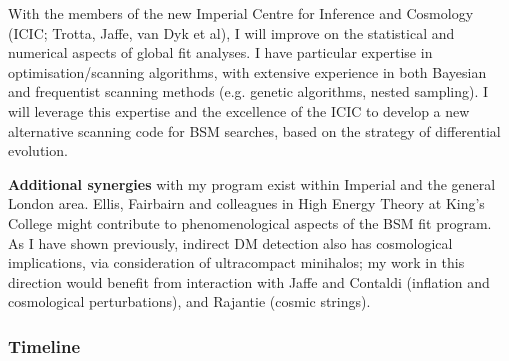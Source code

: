 \documentclass[11pt,oneside,twocolumn,a4paper]{article}
\begin{document}
With the members of the new Imperial Centre for Inference and Cosmology (ICIC; Trotta, Jaffe, van Dyk et al), I will improve on the statistical and numerical aspects of global fit analyses.  I have particular expertise in optimisation/scanning algorithms, with extensive experience in both Bayesian and frequentist scanning methods (e.g. genetic algorithms, nested sampling).  I will leverage this expertise and the excellence of the ICIC to develop a new alternative scanning code for BSM searches, based on the strategy of differential evolution.

\textbf{Additional synergies} with my program exist within Imperial and the general London area.  Ellis, Fairbairn and colleagues in High Energy Theory at King's College might contribute to phenomenological aspects of the BSM fit program.  As I have shown previously, indirect DM detection also has cosmological implications, via consideration of ultracompact minihalos; my work in this direction would benefit from interaction with Jaffe and Contaldi (inflation and cosmological perturbations), and Rajantie (cosmic strings).

\subsubsection*{Timeline}
\end{document}
